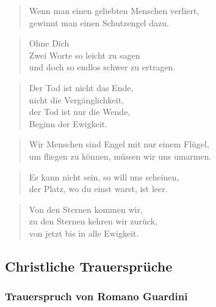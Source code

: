 \documentclass[ngerman,a4paper,11pt]{scrreprt}
\begin{document}
\begin{verse}
Wenn man einen geliebten Menschen verliert, \\
gewinnt man einen Schutzengel dazu. \\
\end{verse}

\begin{verse}
Ohne Dich \\
Zwei Worte so leicht zu sagen \\
und doch so endlos schwer zu ertragen. \\
\end{verse}

\begin{verse}
Der Tod ist nicht das Ende, \\
nicht die Vergänglichkeit, \\
der Tod ist nur die Wende, \\
Beginn der Ewigkeit. \\
\end{verse}

\begin{verse}
Wir Menschen sind Engel mit nur einem Flügel, \\
um fliegen zu können, müssen wir uns umarmen. \\
\end{verse}

\begin{verse}
Es kann nicht sein, so will uns scheinen, \\
der Platz, wo du einst warst, ist leer. \\
\end{verse}

\begin{verse}
Von den Sternen kommen wir, \\
zu den Sternen kehren wir zurück, \\
von jetzt bis in alle Ewigkeit. \\
\end{verse}

\subsection{Christliche Trauersprüche}
\label{sec-1-1-1-2}

\subsubsection*{Trauerspruch von Romano Guardini}
\label{sec-1-1-1-2-1}
\end{document}
